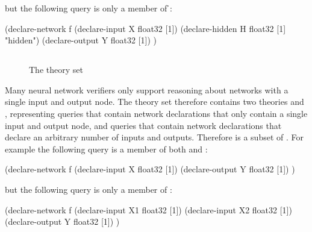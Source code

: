 but the following query is only a member of \h{}:

\begin{code}[style=lbnf]
(declare-network f
    (declare-input  X float32 [1])
    (declare-hidden H float32 [1] "hidden")
    (declare-output Y float32 [1])
)
\end{code}

\subsection{\multiIO{}}
\label{sec:multiple-inputs-outputs}

\begin{figure}[h]
\centering
{}
\caption{The \multiIO{} theory set}
\label{fig:multiple-inputs-outputs-set}
\end{figure}

Many neural network verifiers only support reasoning about networks with a single input and output node. The \multiIO{} theory set therefore contains two theories \sio{} and \mio{}, representing queries that contain network declarations that only contain a single input and output node, and queries that contain network declarations that declare an arbitrary number of inputs and outputs. Therefore \sio{} is a subset of \mio{}. For example the following query is a member of both \sio{} and \mio{}:

\begin{code}[style=lbnf]
(declare-network f
    (declare-input  X float32 [1])
    (declare-output Y float32 [1])
)
\end{code}

but the following query is only a member of \mio{}:

\begin{code}[style=lbnf]
(declare-network f
    (declare-input  X1 float32 [1])
    (declare-input  X2 float32 [1])
    (declare-output Y  float32 [1])
)
\end{code}

\subsection{\multiNetwork{}}
\label{sec:multiple-networks}

